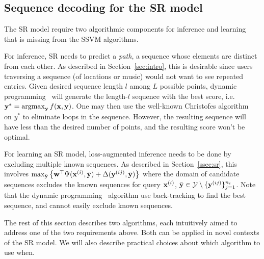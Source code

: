 
\subsection{Sequence decoding for the SR model}
\label{ssec:subtour}

The SR model require two algorithmic components for inference and learning that is missing from the SSVM algorithms. 

For inference, SR needs to predict a {\em path}, \ie a sequence whose elements are distinct from each other. 
As described in Section~\ref{sec:intro}, this is desirable since users traversing a sequence (of locations or music)
would not want to see repeated entries. 
Given desired sequence length $l$ among $L$ possible points, dynamic programming~\cite{tsochantaridis2005large} 
will generate the length-$l$ sequence with the best score, i.e. $\mathbf{y}^* = \operatorname*{argmax}_{\mathbf{y}} f(\mathbf{x},\mathbf{y})$. 
One may then use the well-known 
Christofes algorithm~\cite{christofides1976} on $y^*$ to eliminate loops in the sequence. 
However, the resulting sequence will have less than the desired number of points, and the resulting score won't be optimal. 

For learning an SR model, loss-augmented inference needs to be done by excluding multiple known sequences. 
As described in Section~\ref{ssec:sr}, this involves %
$\max_{\bar{\mathbf{y}}} \left\{ \mathbf{w}^\top \Psi(\mathbf{x}^{(i)}, \bar{\mathbf{y}}) + \Delta(\mathbf{y}^{(ij)}, \bar{\mathbf{y}}) \right\}$
where the domain of candidate sequences excludes the known sequences for query $\mathbf{x}^{(i)}$, \ie $\bar{\mathbf{y}} \in \mathcal{Y} \setminus \{\mathbf{y}^{(ij)}\}_{j=1}^{n_i}$. 
Note that the dynamic programming~\cite{tsochantaridis2005large} algorithm use back-tracking to find the best sequence, 
and cannot easily exclude known sequences. 


The rest of this section describes two algorithms, each intuitively aimed to address one of the two requirements above. 
Both can be applied in novel contexts of the SR model. 
We will also describe practical choices about which algorithm to use when. 


